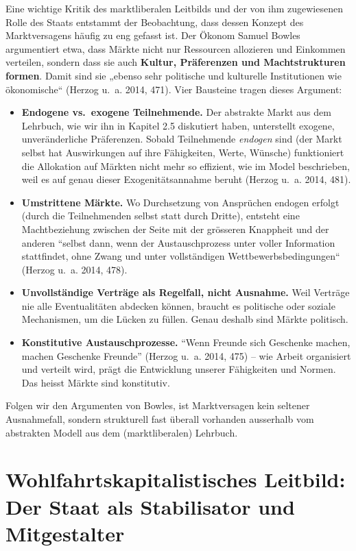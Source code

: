 \documentclass[
  nswissgerman,
  a4paper,
  DIV=11,
  numbers=noendperiod,
  oneside,
  openany]{scrreprt}
\providecommand{\tightlist}{%
  \setlength{\itemsep}{0pt}\setlength{\parskip}{0pt}}
\begin{document}
Eine wichtige Kritik des marktliberalen Leitbilds und der von ihm
zugewiesenen Rolle des Staats entstammt der Beobachtung, dass dessen
Konzept des Marktversagens häufig zu eng gefasst ist. Der Ökonom Samuel
Bowles argumentiert etwa, dass Märkte nicht nur Ressourcen allozieren
und Einkommen verteilen, sondern dass sie auch \textbf{Kultur,
Präferenzen und Machtstrukturen formen}. Damit sind sie „ebenso sehr
politische und kulturelle Institutionen wie ökonomische`` (Herzog u.~a.
2014, 471). Vier Bausteine tragen dieses Argument:

\begin{itemize}
\tightlist
\item
  \textbf{Endogene vs.~exogene Teilnehmende.} Der abstrakte Markt aus
  dem Lehrbuch, wie wir ihn in Kapitel 2.5 diskutiert haben, unterstellt
  exogene, unveränderliche Präferenzen. Sobald Teilnehmende
  \emph{endogen} sind (der Markt selbst hat Auswirkungen auf ihre
  Fähigkeiten, Werte, Wünsche) funktioniert die Allokation auf Märkten
  nicht mehr so effizient, wie im Model beschrieben, weil es auf genau
  dieser Exogenitätsannahme beruht (Herzog u.~a. 2014, 481).
\item
  \textbf{Umstrittene Märkte.} Wo Durchsetzung von Ansprüchen endogen
  erfolgt (durch die Teilnehmenden selbst statt durch Dritte), entsteht
  eine Machtbeziehung zwischen der Seite mit der grösseren Knappheit und
  der anderen ``selbst dann, wenn der Austauschprozess unter voller
  Information stattfindet, ohne Zwang und unter vollständigen
  Wettbewerbsbedingungen`` (Herzog u.~a. 2014, 478).
\item
  \textbf{Unvollständige Verträge als Regelfall, nicht Ausnahme.} Weil
  Verträge nie alle Eventualitäten abdecken können, braucht es
  politische oder soziale Mechanismen, um die Lücken zu füllen. Genau
  deshalb sind Märkte politisch.
\item
  \textbf{Konstitutive Austauschprozesse.} ``Wenn Freunde sich Geschenke
  machen, machen Geschenke Freunde'' (Herzog u.~a. 2014, 475) -- wie
  Arbeit organisiert und verteilt wird, prägt die Entwicklung unserer
  Fähigkeiten und Normen. Das heisst Märkte sind konstitutiv.
\end{itemize}

Folgen wir den Argumenten von Bowles, ist Marktversagen kein seltener
Ausnahmefall, sondern strukturell fast überall vorhanden ausserhalb vom
abstrakten Modell aus dem (marktliberalen) Lehrbuch.

\section{Wohlfahrtskapitalistisches Leitbild: Der Staat als Stabilisator
und
Mitgestalter}\label{wohlfahrtskapitalistisches-leitbild-der-staat-als-stabilisator-und-mitgestalter}
\end{document}
